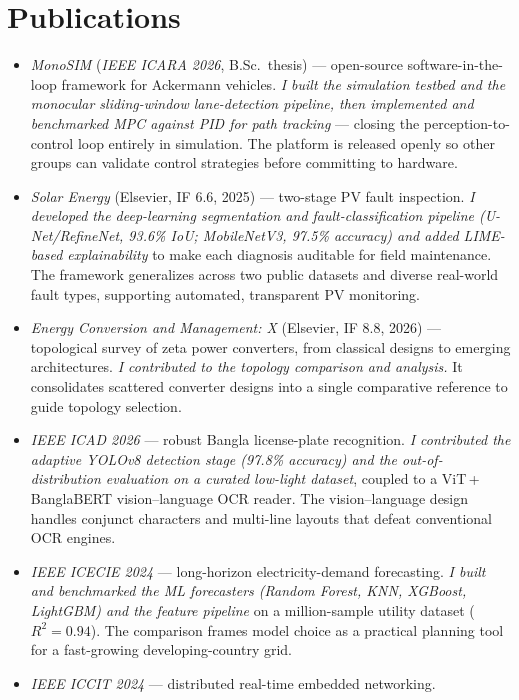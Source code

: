 \documentclass[10.5pt]{article}
\newcommand{\pub}[1]{\textnormal{\textit{#1}}}
\begin{document}
\section*{Publications}
\begin{itemize}
    \item \pub{MonoSIM} (\textit{IEEE ICARA 2026}, B.Sc.\ thesis) --- open-source software-in-the-loop
    framework for Ackermann vehicles. \textit{I built the simulation testbed and the monocular
    sliding-window lane-detection pipeline, then implemented and benchmarked MPC against PID for path
    tracking} --- closing the perception-to-control loop entirely in simulation. The platform is released
    openly so other groups can validate control strategies before committing to hardware.
    \item \textit{Solar Energy} (Elsevier, IF 6.6, 2025) --- two-stage PV fault inspection.
    \textit{I developed the deep-learning segmentation and fault-classification pipeline (U-Net/RefineNet,
    93.6\% IoU; MobileNetV3, 97.5\% accuracy) and added LIME-based explainability} to make each diagnosis
    auditable for field maintenance. The framework generalizes across two public datasets and diverse
    real-world fault types, supporting automated, transparent PV monitoring.
    \item \textit{Energy Conversion and Management: X} (Elsevier, IF 8.8, 2026) --- topological survey of
    zeta power converters, from classical designs to emerging architectures. \textit{I contributed to the
    topology comparison and analysis.} It consolidates scattered converter designs into a single comparative
    reference to guide topology selection.
    \item \textit{IEEE ICAD 2026} --- robust Bangla license-plate recognition.
    \textit{I contributed the adaptive YOLOv8 detection stage (97.8\% accuracy) and the out-of-distribution
    evaluation on a curated low-light dataset}, coupled to a ViT\,+\,BanglaBERT vision--language OCR reader.
    The vision--language design handles conjunct characters and multi-line layouts that defeat conventional
    OCR engines.
    \item \textit{IEEE ICECIE 2024} --- long-horizon electricity-demand forecasting.
    \textit{I built and benchmarked the ML forecasters (Random Forest, KNN, XGBoost, LightGBM) and the
    feature pipeline} on a million-sample utility dataset ($R^2 = 0.94$). The comparison frames model choice
    as a practical planning tool for a fast-growing developing-country grid.
    \item \textit{IEEE ICCIT 2024} --- distributed real-time embedded networking.

\end{itemize}
\end{document}

